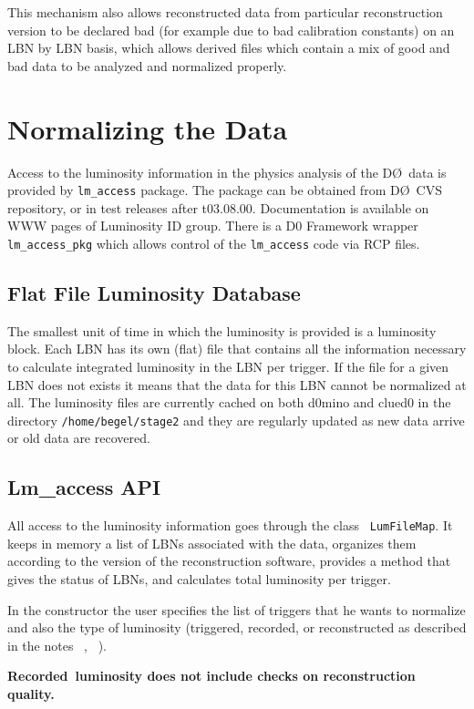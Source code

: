 \documentclass[12pt]{article}
\begin{document}
This mechanism also allows reconstructed data from particular reconstruction
version to be declared bad (for example
due to bad calibration constants) on an LBN by LBN basis, which allows derived
files which contain a mix of good and bad data
to be analyzed and normalized
properly.
\section{Normalizing the Data}

Access to the luminosity information in the physics analysis of the
D\O\ data is provided by {\tt lm\_access} package. The package can be
obtained from D\O\  CVS repository, or in  test releases after t03.08.00.
Documentation is available on WWW  pages of Luminosity ID group.
There is a D0 Framework wrapper {\tt lm\_access\_pkg} which allows
control of the  {\tt lm\_access} code via RCP files.

\subsection{Flat File Luminosity Database}

The smallest unit of time in which the luminosity is provided is a
luminosity block. Each LBN has its own (flat) file that contains all
the information necessary to calculate integrated luminosity in the
LBN per trigger. If the file for a given LBN does not exists it means
that the data for this LBN cannot be normalized at all. The luminosity
files are currently cached on both d0mino and clued0 in the directory
{\tt /home/begel/stage2} and they are regularly updated as new data
arrive or old data are recovered.

\subsection{Lm\_access API}

All access to the luminosity information goes through the class {\tt
LumFileMap}.  It keeps in  memory a list of LBNs associated with the
data, organizes them according to the version of the reconstruction
software, provides a method that gives the  status of LBNs, and
calculates total luminosity per trigger.


In the constructor the  user specifies the list of triggers that he wants
to normalize and also the type of luminosity (triggered, recorded, or
reconstructed as described in the notes ~\cite{3971}, ~\cite{3972}).

\bf Recorded\rm \  luminosity does not include checks on reconstruction quality.
\end{document}
